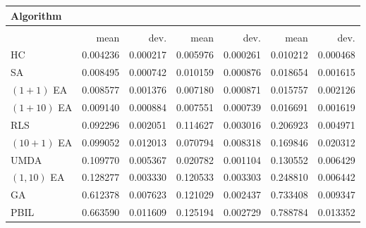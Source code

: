 \begin{tabular}{@{} l *{6}{>{{}}N{1}{2}} @{}}
\toprule
{Algorithm} &  \\
\midrule
&  &  &  \\
\midrule
& {mean} & {dev.} & {mean} & {dev.} & {mean} & {dev.} \\
\midrule
HC & 0.004236 & 0.000217 & 0.005976 & 0.000261 & 0.010212 & 0.000468 \\
SA & 0.008495 & 0.000742 & 0.010159 & 0.000876 & 0.018654 & 0.001615 \\
$(1+1)$ EA & 0.008577 & 0.001376 & 0.007180 & 0.000871 & 0.015757 & 0.002126 \\
$(1+10)$ EA & 0.009140 & 0.000884 & 0.007551 & 0.000739 & 0.016691 & 0.001619 \\
RLS & 0.092296 & 0.002051 & 0.114627 & 0.003016 & 0.206923 & 0.004971 \\
$(10+1)$ EA & 0.099052 & 0.012013 & 0.070794 & 0.008318 & 0.169846 & 0.020312 \\
UMDA & 0.109770 & 0.005367 & 0.020782 & 0.001104 & 0.130552 & 0.006429 \\
$(1,10)$ EA & 0.128277 & 0.003330 & 0.120533 & 0.003303 & 0.248810 & 0.006442 \\
GA & 0.612378 & 0.007623 & 0.121029 & 0.002437 & 0.733408 & 0.009347 \\
PBIL & 0.663590 & 0.011609 & 0.125194 & 0.002729 & 0.788784 & 0.013352 \\
\bottomrule
\end{tabular}
